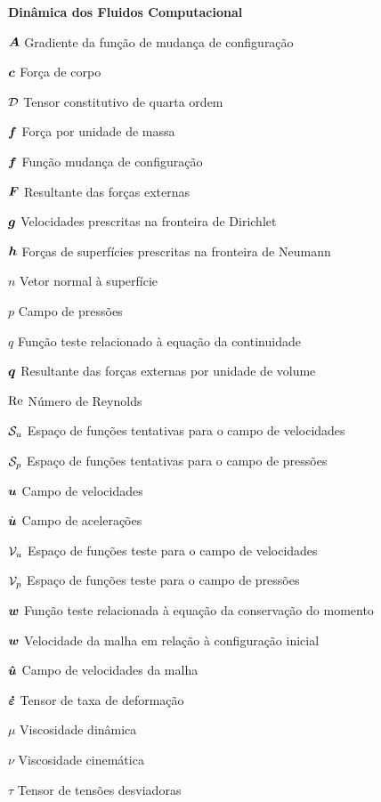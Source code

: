 \begin{simbolos}
    \item[\textbf{Dinâmica dos Fluidos Computacional}]
    \item[$\boldsymbol{A}$] Gradiente da função de mudança de configuração
    \item[$\boldsymbol{c}$] Força de corpo
    \item[$\mathcal{D}$] Tensor constitutivo de quarta ordem
    \item[$\boldsymbol{f}$] Força por unidade de massa
    \item[$\boldsymbol{f}$] Função mudança de configuração
    \item[$\boldsymbol{F}$] Resultante das forças externas
    \item[$\boldsymbol{g}$] Velocidades prescritas na fronteira de Dirichlet
    \item[$\boldsymbol{h}$] Forças de superfícies prescritas na fronteira de Neumann
    \item[$n$] Vetor normal à superfície
    \item[$p$] Campo de pressões
    \item[$q$] Função teste relacionado à equação da continuidade
    \item[$\boldsymbol{q}$] Resultante das forças externas por unidade de volume
    \item[$\mathrm{Re}$] Número de Reynolds
    \item[$\mathcal{S}_u$] Espaço de funções tentativas para o campo de velocidades
    \item[$\mathcal{S}_p$] Espaço de funções tentativas para o campo de pressões
    \item[$\boldsymbol{u}$] Campo de velocidades
    \item[$\dot{\boldsymbol{u}}$] Campo de acelerações
    \item[$\mathcal{V}_u$] Espaço de funções teste para o campo de velocidades
    \item[$\mathcal{V}_p$] Espaço de funções teste para o campo de pressões
    \item[$\boldsymbol{w}$] Função teste relacionada à equação da conservação do momento
    \item[$\boldsymbol{w}$] Velocidade da malha em relação à configuração inicial
    \item[$\boldsymbol{\hat{u}}$] Campo de velocidades da malha
    \item[$\boldsymbol{\dot{\varepsilon}}$] Tensor de taxa de deformação
    \item[$\mu$] Viscosidade dinâmica
    \item[$\nu$] Viscosidade cinemática
    \item[$\tau$] Tensor de tensões desviadoras


\end{simbolos}
